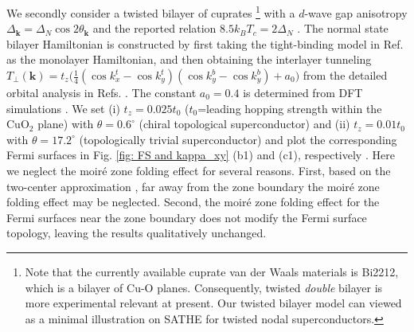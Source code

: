 We secondly consider a twisted bilayer of cuprates \footnote{Note that the currently available cuprate van der Waals materials is Bi2212, which is a bilayer of Cu-O planes. Consequently, twisted \emph{double} bilayer is more experimental relevant at present. Our twisted bilayer model can viewed as a minimal illustration on SATHE for twisted nodal superconductors.} with a $d$-wave gap anisotropy $\varDelta_{\bm{k}}=\varDelta_N\cos2\theta_{\bm{k}}$ \cite{kanigel2007protected,kondo2015point} and the reported relation $8.5k_BT_c=2\varDelta_N$ \cite{kendziora1996superconducting,anzai2013relation}. The normal state bilayer Hamiltonian is constructed by first taking the tight-binding model in Ref. \cite{eschrig2003effect} as the monolayer Hamiltonian, and then obtaining the interlayer tunneling $T_\perp(\bm{k})=t_z\big(\frac{1}{4}(\cos k_x^t-\cos k_y^t)(\cos k_y^b-\cos k_y^b)+a_0\big)$ from the detailed orbital analysis in Refs. \cite{song2022doping,markiewicz2005one}. The constant $a_0=0.4$ is determined from DFT simulations \cite{markiewicz2005one}. We set (i) $t_z=0.025t_0$ ($t_0$=leading hopping strength within the $\mathrm{CuO}_2$ plane) with $\theta=0.6^\circ$ (chiral topological superconductor) and (ii) $t_z=0.01t_0$ with $\theta=17.2^\circ$ (topologically trivial superconductor) and plot the corresponding Fermi surfaces in Fig. \ref{fig: FS and kappa_xy} (b1) and (c1), respectively \cite{volkov2023current,volkov2023magic}. Here we neglect the moir\'e zone folding effect for several reasons. First, based on the two-center approximation \cite{bistritzer2011moire}, far away from the zone boundary the moir\'e zone folding effect may be neglected. Second, the moir\'e zone folding effect for the Fermi surfaces near the zone boundary does not modify the Fermi surface topology, leaving the results qualitatively unchanged.

